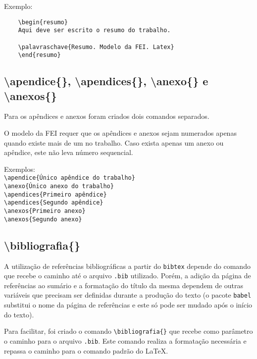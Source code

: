 \documentclass{fei}
\begin{document}
    Exemplo:
    \begin{verbatim}
    \begin{resumo}
    Aqui deve ser escrito o resumo do trabalho.

    \palavraschave{Resumo. Modelo da FEI. Latex}
    \end{resumo}
    \end{verbatim}
    
    \subsection{\textbackslash apendice\{\}, \textbackslash apendices\{\}, \textbackslash anexo\{\} e \textbackslash anexos\{\}}
    Para os apêndices e anexos foram criados dois comandos separados.

    O modelo da FEI requer que os apêndices e anexos sejam numerados apenas quando existe mais de um no trabalho. Caso exista apenas um anexo ou apêndice, este não leva número sequencial.

    Exemplos: \\
    \verb+\apendice{Único apêndice do trabalho}+ \\
    \verb+\anexo{Único anexo do trabalho}+ \\

    \noindent{}
    \verb+\apendices{Primeiro apêndice}+\\
    \verb+\apendices{Segundo apêndice}+\\

    \noindent{}
    \verb+\anexos{Primeiro anexo}+\\
    \verb+\anexos{Segundo anexo}+\\

    \subsection{\textbackslash bibliografia\{\}}
    A utilização de referências bibliográficas a partir do \texttt{bibtex} depende do comando \verb++ que recebe o caminho até o arquivo \texttt{.bib} utilizado. Porém, a adição da página de referências ao sumário e a formatação do título da mesma dependem de outras variáveis que precisam ser definidas durante a produção do texto (o pacote \verb+babel+ substitui o nome da página de referências e este só pode ser mudado após o início do texto).

    Para facilitar, foi criado o comando \verb+\bibliografia{}+ que recebe como parâmetro o caminho para o arquivo \texttt{.bib}. Este comando realiza a formatação necessária e repassa o caminho para o comando \verb++ padrão do \LaTeX.
\end{document}
